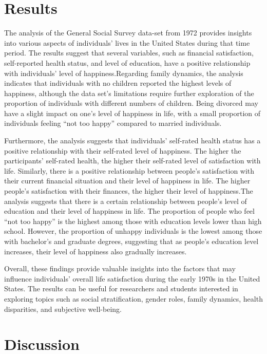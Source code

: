 \documentclass[
  letterpaper,
  DIV=11,
  numbers=noendperiod]{scrartcl}
\begin{document}
\hypertarget{results}{%
\section{Results}\label{results}}

The analysis of the General Social Survey data-set from 1972 provides
insights into various aspects of individuals' lives in the United States
during that time period. The results suggest that several variables,
such as financial satisfaction, self-reported health status, and level
of education, have a positive relationship with individuals' level of
happiness.Regarding family dynamics, the analysis indicates that
individuals with no children reported the highest levels of happiness,
although the data set's limitations require further exploration of the
proportion of individuals with different numbers of children. Being
divorced may have a slight impact on one's level of happiness in life,
with a small proportion of individuals feeling ``not too happy''
compared to married individuals.

Furthermore, the analysis suggests that individuals' self-rated health
status has a positive relationship with their self-rated level of
happiness. The higher the participants' self-rated health, the higher
their self-rated level of satisfaction with life. Similarly, there is a
positive relationship between people's satisfaction with their current
financial situation and their level of happiness in life. The higher
people's satisfaction with their finances, the higher their level of
happiness.The analysis suggests that there is a certain relationship
between people's level of education and their level of happiness in
life. The proportion of people who feel ``not too happy'' is the highest
among those with education levels lower than high school. However, the
proportion of unhappy individuals is the lowest among those with
bachelor's and graduate degrees, suggesting that as people's education
level increases, their level of happiness also gradually increases.

Overall, these findings provide valuable insights into the factors that
may influence individuals' overall life satisfaction during the early
1970s in the United States. The results can be useful for researchers
and students interested in exploring topics such as social
stratification, gender roles, family dynamics, health disparities, and
subjective well-being.

\hypertarget{discussion}{%
\section{Discussion}\label{discussion}}
\end{document}
